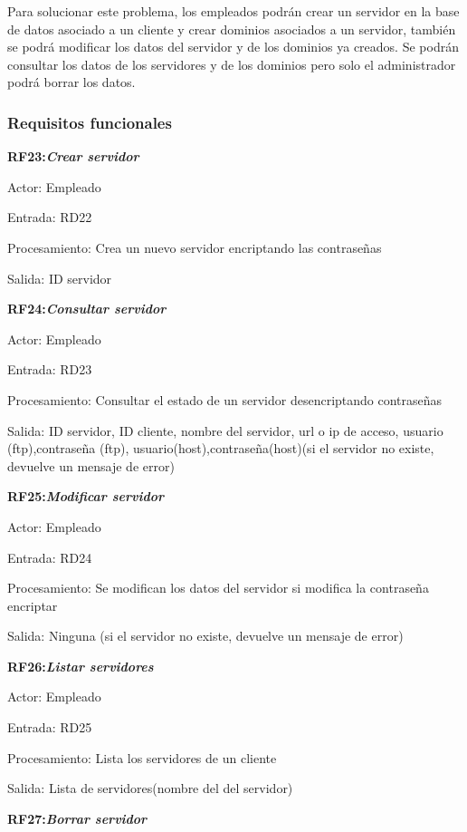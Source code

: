 \documentclass[paper=a4, fontsize=11pt, spanish]{scrartcl}
\begin{document}
Para solucionar este problema, los empleados podrán crear un servidor en la base de datos asociado a un cliente y crear dominios asociados a un servidor, también se podrá modificar los datos del servidor y de los dominios ya creados. Se podrán consultar los datos de los servidores y de los dominios pero solo el administrador podrá borrar los datos.

\subsubsection{Requisitos funcionales}
\setlength{\parindent}{0em}
\textbf{RF23:\textit{Crear servidor}}
\setlength{\parindent}{3em}

Actor: Empleado

Entrada: RD22

Procesamiento: Crea un nuevo servidor encriptando las contraseñas

Salida: ID servidor

\setlength{\parindent}{0em}
\textbf{RF24:\textit{Consultar servidor}}
\setlength{\parindent}{3em}

Actor: Empleado

Entrada: RD23

Procesamiento: Consultar el estado de un servidor desencriptando contraseñas

Salida: ID servidor, ID cliente, nombre del servidor, url o ip de acceso, usuario (ftp),contraseña (ftp), usuario(host),contraseña(host)(si el servidor no existe, devuelve un mensaje de error)

\setlength{\parindent}{0em}
\textbf{RF25:\textit{Modificar servidor}}
\setlength{\parindent}{3em}

Actor: Empleado

Entrada: RD24

Procesamiento: Se modifican los datos del servidor si modifica la contraseña encriptar

Salida: Ninguna (si el servidor no existe, devuelve un mensaje de error)

\setlength{\parindent}{0em}
\textbf{RF26:\textit{Listar servidores}}
\setlength{\parindent}{3em}

Actor: Empleado

Entrada: RD25

Procesamiento: Lista los servidores de un cliente

Salida: Lista de servidores(nombre del del servidor)

\setlength{\parindent}{0em}
\textbf{RF27:\textit{Borrar servidor}}
\setlength{\parindent}{3em}
\end{document}
